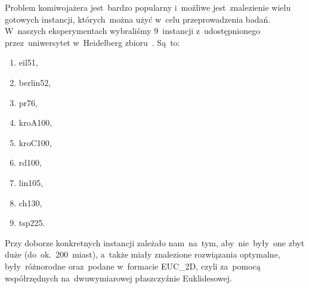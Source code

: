 Problem komiwojażera jest~bardzo popularny i~możliwe jest~znalezienie wielu gotowych instancji, których~można użyć w~celu przeprowadzenia badań. W~naszych eksperymentach wybraliśmy 9~instancji z~udostępnionego przez~uniwersytet w~Heidelberg zbioru~\cite{instances}. Są~to:

\begin{enumerate}
    \item eil51,
    \item berlin52,
    \item pr76,
    \item kroA100,
    \item kroC100,
    \item rd100,
    \item lin105,
    \item ch130,
    \item tsp225.
\end{enumerate}

\noindent
Przy doborze konkretnych instancji zależało nam~na~tym, aby~nie~były~one zbyt duże (do~ok.~200~miast), a~także miały znalezione rozwiązania optymalne, były~różnorodne oraz~podane w~formacie EUC\_2D, czyli za~pomocą współrzędnych na~dwuwymiarowej płaszczyźnie Euklidesowej.